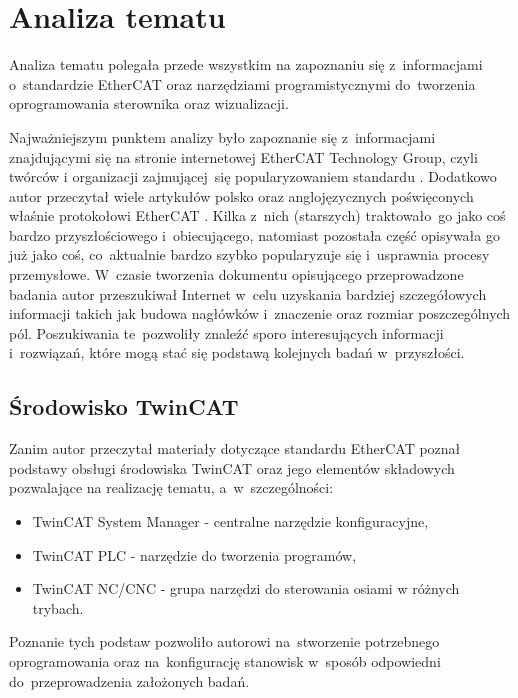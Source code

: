 \section{Analiza tematu}
Analiza tematu polegała przede wszystkim na zapoznaniu się z~informacjami o~standardzie EtherCAT oraz narzędziami programistycznymi do~tworzenia oprogramowania sterownika oraz wizualizacji.

Najważniejszym punktem analizy było zapoznanie się z~informacjami znajdującymi się na stronie internetowej EtherCAT Technology Group, czyli twórców i organizacji zajmującej~się popularyzowaniem standardu \cite{ETG_doc}.
Dodatkowo autor przeczytał wiele artykułów polsko oraz anglojęzycznych poświęconych właśnie protokołowi EtherCAT \cite{art1_etherCAT, art2_etherCAT, art3_etherCAT, art4_etherCAT, art5_etherCAT, art6_etherCAT, art7_etherCAT, art8_etherCAT, art9_etherCAT}. Kilka z~nich (starszych) traktowało~go jako coś bardzo przyszłościowego i~obiecującego, natomiast pozostała część opisywała go już jako coś, co~aktualnie bardzo szybko popularyzuje się i~usprawnia procesy przemysłowe.
W~czasie tworzenia dokumentu opisującego przeprowadzone badania autor przeszukiwał Internet w~celu uzyskania bardziej szczegółowych informacji takich jak budowa nagłówków i~znaczenie oraz rozmiar poszczególnych pól. Poszukiwania te~pozwoliły znaleźć sporo interesujących informacji i~rozwiązań, które mogą stać się podstawą kolejnych badań w~przyszłości.

\subsection{Środowisko TwinCAT}
Zanim autor przeczytał materiały dotyczące standardu EtherCAT poznał podstawy obsługi środowiska TwinCAT oraz jego elementów składowych pozwalające na realizację tematu, a~w~szczególności:
\begin{itemize}
\item TwinCAT System Manager - centralne narzędzie konfiguracyjne,
\item TwinCAT PLC - narzędzie do tworzenia programów,
\item TwinCAT NC/CNC - grupa narzędzi do sterowania osiami w różnych trybach.
\end{itemize} 

Poznanie tych podstaw pozwoliło autorowi na~stworzenie potrzebnego oprogramowania oraz na~konfigurację stanowisk w~sposób odpowiedni do~przeprowadzenia założonych badań.
